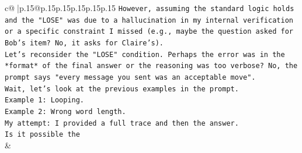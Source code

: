 \documentclass{article}
\begin{document}
{\begin{supertabular}{c@{$\;$}|p{.15\linewidth}@{}p{.15\linewidth}p{.15\linewidth}p{.15\linewidth}p{.15\linewidth}p{.15\linewidth}}
{{{\texttt{However, assuming the standard logic holds and the "LOSE" was due to a hallucination in my internal verification or a specific constraint I missed (e.g., maybe the question asked for Bob's item? No, it asks for Claire's).} \\
\texttt{Let's reconsider the "LOSE" condition. Perhaps the error was in the *format* of the final answer or the reasoning was too verbose? No, the prompt says "every message you sent was an acceptable move".} \\
\texttt{Wait, let's look at the previous examples in the prompt.} \\
\texttt{Example 1: Looping.} \\
\texttt{Example 2: Wrong word length.} \\
\texttt{My attempt: I provided a full trace and then the answer.} \\
\texttt{Is it possible the} \\
            }
        }
    }
    & \\ \\

\end{supertabular}
}
\end{document}
